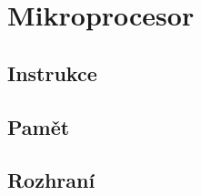 \chapter{Mikroprocesor}

\blind[1]

\section{Instrukce}

\blind[2]

\section{Pamět}

\blind[2]

\section{Rozhraní}

\blind[3]